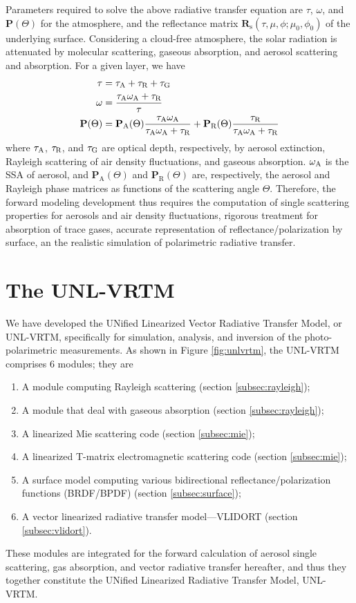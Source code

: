 Parameters required to solve the above radiative transfer equation are $\tau$,
$\omega$, and $\mathbf{P}(\Theta)$ for the atmosphere, and the reflectance
matrix $\mathbf{R}_\text{s}(\tau,\mu,\phi; \mu_0, \phi_0)$ of 
the underlying surface. Considering a cloud-free atmosphere, the solar
radiation is attenuated by molecular scattering, gaseous absorption, and
aerosol scattering and absorption. For a given layer, we have
\begin{align}
\tau   &= \tau_\text{A} + \tau_\text{R} + \tau_\text{G}  \label{eq:opt1} \\
\omega &= \frac{\tau_\text{A}\omega_\text{A} + \tau_\text{R}}{\tau} \label{eq:opt2} \\
\mathbf{P}(\Theta) &=\mathbf{P}_\text{A}(\Theta)
                     \frac{\tau_\text{A}\omega_\text{A}}{\tau_\text{A}\omega_\text{A}+\tau_\text{R}} 
                    + \mathbf{P}_\text{R}(\Theta)
                    \frac{\tau_\text{R}}{\tau_\text{A}\omega_\text{A}+\tau_\text{R}} \label{eq:opt3}
\end{align}
where $\tau_\text{A}$, $\tau_\text{R}$, and $\tau_\text{G}$ are optical depth, respectively, by 
aerosol extinction, Rayleigh scattering of air density fluctuations, 
and gaseous absorption. $\omega_\text{A}$ is the SSA of aerosol,  and
$\mathbf{P}_\text{A}(\Theta)$ and $\mathbf{P}_\text{R}(\Theta)$ are, 
respectively, the aerosol and Rayleigh phase matrices as functions of the 
scattering angle $\Theta$. Therefore, the forward modeling development 
thus requires the computation of single scattering properties for aerosols and
air density fluctuations, rigorous treatment for absorption of trace gases, 
accurate representation of reflectance/polarization by surface, an the
realistic simulation of polarimetric radiative transfer. 

\section{The UNL-VRTM} \label{sec:unlvrtm}

We have developed the UNified Linearized Vector
Radiative Transfer Model, or UNL-VRTM, specifically for simulation,
analysis, and inversion of the photo-polarimetric measurements.
As shown in Figure \ref{fig:unlvrtm}, the UNL-VRTM comprises 6
modules; they are 
\begin{enumerate}
\item A module computing Rayleigh scattering (section
\ref{subsec:rayleigh});
\item A module that deal with gaseous absorption (section \ref{subsec:rayleigh});
\item A linearized Mie scattering code (section \ref{subsec:mie});
\item A linearized T-matrix electromagnetic scattering code (section
\ref{subsec:mie});
\item A surface model computing various bidirectional
reflectance/polarization functions (BRDF/BPDF) (section
\ref{subsec:surface});
\item A vector linearized radiative transfer model---VLIDORT (section
\ref{subsec:vlidort}). 
\end{enumerate}
These modules are integrated for the forward calculation of
aerosol single scattering, gas absorption, and vector radiative transfer
hereafter, and thus they together constitute the UNified Linearized
Radiative Transfer Model, UNL-VRTM. 

